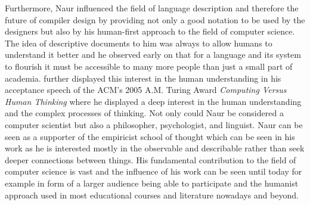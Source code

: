 \documentclass{article}
\begin{document}
Furthermore, Naur influenced the field of language description and therefore the future of compiler design by providing not only a good notation to be used by the designers but also by his human-first approach to the field of computer science. The idea of descriptive documents to him was always to allow humans to understand it better and he observed early on that for a language and its system to flourish it must be accessible to many more people than just a small part of academia. \cite{naur2007computing} further displayed this interest in the human understanding in his acceptance speech of the ACM's 2005 A.M. Turing Award \textit{Computing Versus Human Thinking} where he displayed a deep interest in the human understanding and the complex processes of thinking. Not only could Naur be considered a computer scientist but also a philosopher, psychologist, and linguist. Naur can be seen as a supporter of the empiricist school of thought which can be seen in his work as he is interested mostly in the observable and describable rather than seek deeper connections between things. His fundamental contribution to the field of computer science is vast and the influence of his work can be seen until today for example in form of a larger audience being able to participate and the humanist approach used in most educational courses and literature nowadays and beyond.
\newpage


\end{document}
